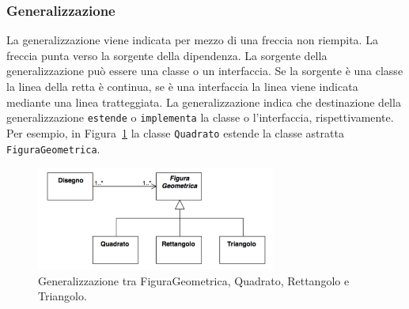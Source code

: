 \documentclass{article}
\begin{document}
\subsubsection{Generalizzazione}
La generalizzazione viene indicata per mezzo di una freccia non riempita. La freccia punta verso la sorgente della dipendenza. La sorgente della generalizzazione pu\`o essere una classe o un interfaccia. Se la sorgente \`e una classe la linea della retta \`e continua, se \`e una interfaccia la linea  viene indicata mediante una linea tratteggiata. 
La generalizzazione indica che destinazione della generalizzazione \texttt{estende} o \texttt{implementa} la classe o l'interfaccia, rispettivamente.
Per esempio, in Figura~\ref{Fig:Generalizzazione} la classe \texttt{Quadrato} estende la classe astratta  \texttt{FiguraGeometrica}.

\begin{figure}[h!]
  \centering
    \includegraphics[width=0.7\textwidth]{Img/Generalizzazione.pdf}
      \caption{Generalizzazione tra FiguraGeometrica, Quadrato, Rettangolo e Triangolo.}
      \label{Fig:Generalizzazione}
\end{figure}
\end{document}
